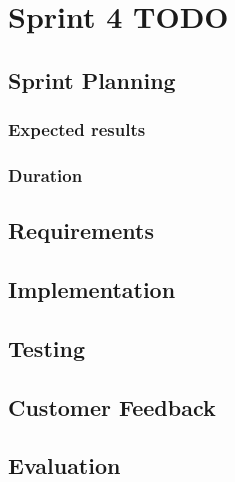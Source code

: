 \section{Sprint 4 TODO}

	\subsection{Sprint Planning}

	\subsubsection{Expected results}
	
	\subsubsection{Duration}

	\subsection{Requirements}

	\subsection{Implementation}

	\subsection{Testing}

	\subsection{Customer Feedback}

	\subsection{Evaluation}